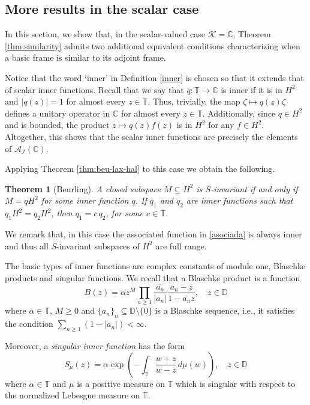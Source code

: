\documentclass[a4paper,12pt]{amsart}
\def\cA{{\mathcal{A}}}
\def\C{{\mathbb{C}}}
\def\D{{\mathbb{D}}}
\def\cI{{\mathcal{I}}}
\def\KK{{\mathcal{K}}}
\def\T{{\mathbb{T}}}
\newcommand{\abs}[1]{{\left|{#1}\right|}}
\newtheorem{theorem}{Theorem}[section]
\theoremstyle{definition}
\begin{document}
\subsection{More results in the scalar case}

In this section, we show that, in the scalar-valued case $\KK=\C$, Theorem \ref{thm:similarity} admits two additional equivalent conditions characterizing when a basic frame is similar to its adjoint frame.

Notice that the word `inner' in Definition \ref{inner} is chosen so that it extends that of scalar inner functions. Recall that we say that $q:\T\to\C$ is inner if it is in $H^2$ and $\abs{q(z)}=1$ for almost every $z\in\T$. Thus, trivially, the map $\zeta\mapsto q(z)\zeta$ defines a unitary operator in $\C$ for almost every $z\in\T$. Additionally, since $q\in H^2$ and is bounded, the product $z\mapsto q(z)f(z)$ is in $H^2$ for any $f\in H^2$. 
Altogether, this shows that the scalar inner functions are precisely the elements of $\cA_\cI(\C)$.

Applying Theorem \ref{thm:beu-lax-hal} to this case we obtain the following.


\begin{theorem}[Beurling]\label{thm:beurling}
A closed subspace $M\subseteq H^2$ is $S$-invariant if and only if $M=qH^2$ for some inner function $q$. If $q_1$ and $q_2$ are inner functions such that $q_1 H^2 = q_2 H^2$, then $q_1 = c\, q_2$, for some $c\in\T$.
\end{theorem}

We remark that, in this case the associated function in \eqref{asociada} is always inner and thus all $S$-invariant subspaces of $H^2$ are full range.

The basic types of inner functions are complex constants of module one, 
Blaschke products and singular functions. We recall that a Blaschke product is a function
\begin{equation}
B(z) =\alpha z^{M}\prod_{n\geqslant 1}\frac{\overline{a_{n}}}{|a_{n}|}\frac{a_{n} -z}{1-\overline{a_{n}}z},\quad z\in\D
\end{equation}
where $\alpha\in\T$, $M\geqslant0$ and $\{a_{n}\}_n\subseteq\D\setminus\{0\}$ is a Blaschke sequence, i.e., it satisfies the condition $\sum_{n\geqslant1} (1-|a_{n}|) <\infty$.

Moreover, a {\em singular inner function} has the form
\begin{equation} 
S_{\mu}(z) =\alpha\exp\left( -\int_\T\frac{w+z}{w-z}\,d\mu(w)\right),\quad z\in\D
\end{equation}
where $\alpha\in\T$ and $\mu$ is a positive measure on $\T$ which is singular with respect to the normalized Lebesgue measure on $\T$.
\end{document}
